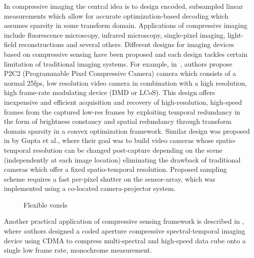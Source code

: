\documentclass[journal]{IEEEtran}
\begin{document}
In compressive imaging the central idea is to design encoded, subsampled linear measurements which allow for accurate optimization-based decoding which assumes sparsity in some transform domain. Applications of compressive imaging include fluorescence microscopy, infrared microscopy, single-pixel imaging, light-field reconstructions and several others. Different designs for imaging devices based on compressive sensing have been proposed and each design tackles certain limitation of traditional imaging systems. For example, in~\cite{Reddy2011}, authors propose P2C2 (Programmable Pixel Compressive Camera) camera which consists of a normal 25fps, low resolution video camera in combination with a high resolution, high frame-rate modulating device (DMD or LCoS). This design offers inexpensive and efficient acquisition and recovery of high-resolution, high-speed frames from the captured low-res frames by exploiting temporal redundancy in the form of brightness constancy and spatial redundancy through transform domain sparsity in a convex optimization framework. Similar design was proposed in \cite{Gupta2010} by Gupta et al., where their goal was to build video cameras whose spatio-temporal resolution can be changed post-capture depending on the scene (independently at each image location) eliminating the drawback of traditional cameras which offer a fixed spatio-temporal resolution. Proposed sampling scheme requires a fast per-pixel shutter on the sensor-array, which was implemented using a co-located camera-projector system. 
%
\begin{figure}
	\centering
	
	\label{fig:flexible_voxels}
	
	\caption{Flexible voxels}
\end{figure}

Another practical application of compressive sensing framework is described in \cite{Tsai2015}, where authors designed a coded aperture compressive spectral-temporal imaging device using CDMA to compress multi-spectral and high-speed data cube onto a single low frame rate, monochrome measurement. 
\end{document}

